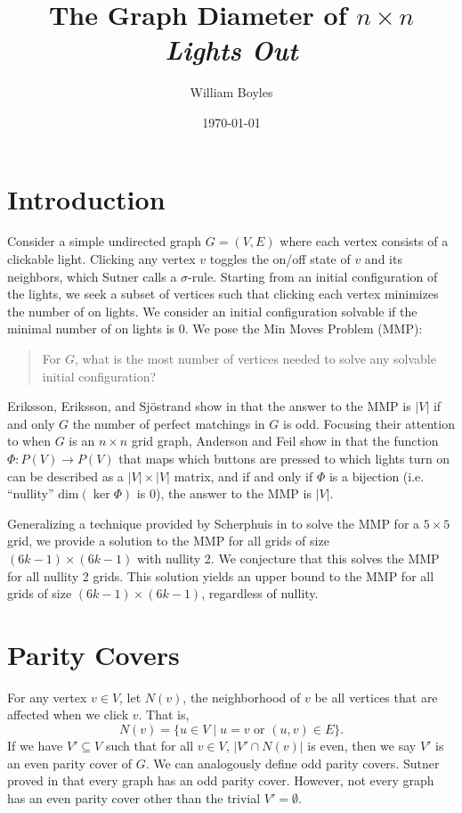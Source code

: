 \documentclass[a4paper]{article}
\newcommand{\abs}[1]{\left| #1 \right|}
\renewcommand{\dim}[1]{\text{dim}\left( #1 \right)}
\begin{document}
	\title{The Graph Diameter of $n \times n$ \textit{Lights Out}}
	\author{William Boyles}
	\date{\today}
	\maketitle
	
	\section{Introduction}
	Consider a simple undirected graph $G=(V,E)$ where each vertex consists of a clickable light.
	Clicking any vertex $v$ toggles the on/off state of $v$ and its neighbors, which Sutner calls a $\sigma$-rule.
	Starting from an initial configuration of the lights, we seek a subset of vertices such that clicking each vertex minimizes the number of on lights.
	We consider an initial configuration solvable if the minimal number of on lights is 0.
	We pose the Min Moves Problem (MMP):
	\begin{quote}
		For $G$, what is the most number of vertices needed to solve any solvable initial configuration?
	\end{quote}
	Eriksson, Eriksson, and Sjöstrand show in \cite{ERIKSSON2001357} that the answer to the MMP is $\abs{V}$ if and only $G$ the number of perfect matchings in $G$ is odd.
	Focusing their attention to when $G$ is an $n \times n$ grid graph, Anderson and Feil show in \cite{anderson_feil} that the function $\Phi: P(V) \to P(V)$ that maps which buttons are pressed to which lights turn on can be described as a $\abs{V} \times \abs{V}$ matrix, and if and only if $\Phi$ is a bijection (i.e. ``nullity'' $\dim{\ker{\Phi}}$ is 0), the answer to the MMP is $\abs{V}$.
	
	Generalizing a technique provided by Scherphuis in \cite{jaap} to solve the MMP for a $5 \times 5$ grid, we provide a solution to the MMP for all grids of size $(6k-1) \times (6k-1)$ with nullity 2.
	We conjecture that this solves the MMP for all nullity 2 grids.
	This solution yields an upper bound to the MMP for all grids of size $(6k-1) \times (6k-1)$, regardless of nullity.
	
	\section{Parity Covers}
	For any vertex $v \in V$, let $N(v)$, the neighborhood of $v$ be all vertices that are affected when we click $v$.
	That is,
	\begin{equation*}
		N(v) = \{u \in V \mid u=v \text{ or } (u,v) \in E\}.
	\end{equation*}
	If we have $V' \subseteq V$ such that for all $v \in V$, $\abs{V' \cap N(v)}$ is even, then we say $V'$ is an even parity cover of $G$.
	We can analogously define odd parity covers.
	Sutner proved in \cite{Sutner1989} that every graph has an odd parity cover.
	However, not every graph has an even parity cover other than the trivial $V' = \emptyset$.
	
\end{document}
